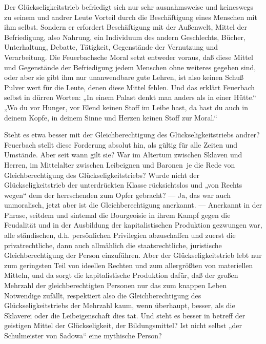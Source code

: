 Der Glückseligkeitstrieb befriedigt sich nur sehr ausnahmsweise
und keineswegs zu seinem und andrer Leute Vorteil durch die
Beschäftigung eines Menschen mit ihm selbst. Sondern er erfordert
Beschäftigung mit der Außenwelt, Mittel der Befriedigung, also Nahrung,
ein Individuum des andern Geschlechts, Bücher, Unterhaltung, Debatte,
Tätigkeit, Gegenstände der Vernutzung und Verarbeitung. Die
Feuerbachsche Moral setzt entweder voraus, daß diese Mittel und
Gegenstände der Befriedigung jedem Menschen ohne weiteres gegeben sind,
oder aber sie gibt ihm nur unanwendbare gute Lehren, ist also keinen
Schuß Pulver wert für die Leute, denen diese Mittel fehlen. Und das
erklärt Feuerbach selbst in dürren Worten: „In einem Palast denkt man
anders als in einer Hütte.`` „Wo du vor Hunger, vor Elend keinen Stoff im
Leibe hast, da hast du auch in deinem Kopfe, in deinem Sinne und Herzen
keinen Stoff zur Moral.``

Steht es etwa besser mit der Gleichberechtigung des
Glückseligkeitstriebs andrer? Feuerbach stellt diese Forderung absolut
hin, als gültig für alle Zeiten und Umstände. Aber seit wann gilt sie?
War im Altertum zwischen Sklaven und Herren, im Mittelalter zwischen
Leibeignen und Baronen\est\ je die Rede von Gleichberechtigung des
Glückseligkeitstriebs? Wurde nicht der Glückseligkeitstrieb der
unterdrückten Klasse rücksichtslos und „von Rechts wegen`` dem der
herrschenden zum Opfer gebracht? --- Ja, das war auch unmoralisch, jetzt
aber ist die Gleichberechtigung anerkannt. --- Anerkannt in der Phrase,
seitdem und sintemal die Bourgeoisie in ihrem Kampf gegen die Feudalität
und in der Ausbildung der kapitalistischen Produktion gezwungen war,
alle ständischen, d.h. persönlichen Privilegien abzuschaffen und zuerst
die privatrechtliche, dann auch allmählich die staatsrechtliche,
juristische Gleichberechtigung der Person einzuführen. Aber der
Glückseligkeitstrieb lebt nur zum geringsten Teil von ideellen Rechten
und zum allergrößten von materiellen Mitteln, und da sorgt die
kapitalistische Produktion dafür, daß der großen Mehrzahl der
gleichberechtigten Personen nur das zum knappen Leben Notwendige
zufällt, respektiert also die Gleichberechtigung des
Glückseligkeitstriebs der Mehrzahl kaum, wenn überhaupt, besser, als die
Sklaverei oder die Leibeigenschaft dies tat. Und steht es besser in
betreff der geistigen Mittel der Glückseligkeit, der Bildungsmittel? Ist
nicht selbst „der Schulmeister von Sadowa`` eine mythische Person?

